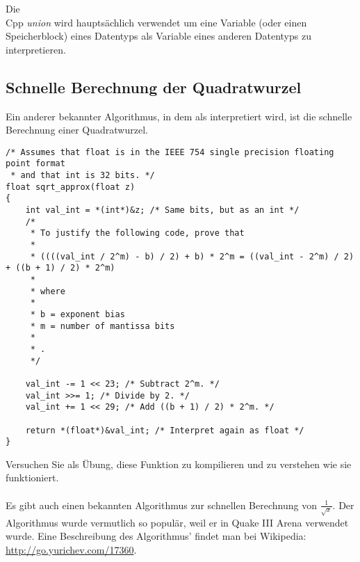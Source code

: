 
Die \\Cpp \emph{union} wird hauptsächlich verwendet um eine Variable (oder einen Speicherblock) eines Datentyps als
Variable eines anderen Datentyps zu interpretieren.





\subsection{Schnelle Berechnung der Quadratwurzel}

Ein anderer bekannter Algorithmus, in dem \Tfloat als \Tint interpretiert wird, ist die schnelle Berechnung einer
Quadratwurzel.

\begin{lstlisting}[caption=Quellcode stammt aus der Wikipedia: \url{http://go.yurichev.com/17364},style=customc]
/* Assumes that float is in the IEEE 754 single precision floating point format
 * and that int is 32 bits. */
float sqrt_approx(float z)
{
    int val_int = *(int*)&z; /* Same bits, but as an int */
    /*
     * To justify the following code, prove that
     *
     * ((((val_int / 2^m) - b) / 2) + b) * 2^m = ((val_int - 2^m) / 2) + ((b + 1) / 2) * 2^m)
     *
     * where
     *
     * b = exponent bias
     * m = number of mantissa bits
     *
     * .
     */
 
    val_int -= 1 << 23; /* Subtract 2^m. */
    val_int >>= 1; /* Divide by 2. */
    val_int += 1 << 29; /* Add ((b + 1) / 2) * 2^m. */
 
    return *(float*)&val_int; /* Interpret again as float */
}
\end{lstlisting}

Versuchen Sie als Übung, diese Funktion zu kompilieren und zu verstehen wie sie funktioniert.\\\\
Es gibt auch einen bekannten Algorithmus zur schnellen Berechnung von $\frac{1}{\sqrt{x}}$.
Der Algorithmus wurde vermutlich so populär, weil er in Quake III Arena verwendet wurde.
Eine Beschreibung des Algorithmus' findet man bei Wikipedia: \url{http://go.yurichev.com/17360}.
